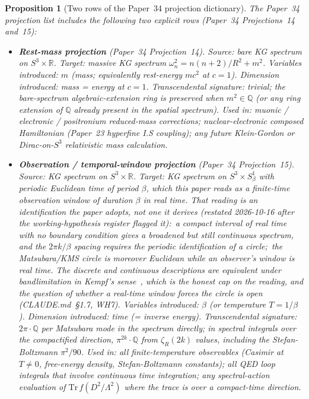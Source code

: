\documentclass[11pt]{article}
\newtheorem{proposition}{Proposition}
\begin{document}
\begin{proposition}[Two rows of the Paper~34 projection dictionary]
\label{prop:two_rows}
The Paper~34 projection list includes the following two explicit rows
(Paper~34 Projections~14 and~15):

\begin{itemize}
\setlength\itemsep{0pt}
\item \textbf{Rest-mass projection} (Paper~34 Projection~14).
\textit{Source:} bare KG spectrum on $S^3 \times \mathbb{R}$.
\textit{Target:} massive KG spectrum
$\omega_n^2 = n(n+2)/R^2 + m^2$.
\textit{Variables introduced:} $m$ (mass; equivalently rest-energy
$mc^2$ at $c=1$).
\textit{Dimension introduced:} mass = energy at $c = 1$.
\textit{Transcendental signature:} \emph{trivial}; the bare-spectrum
algebraic-extension ring is preserved when $m^2 \in \mathbb{Q}$ (or any
ring extension of $\mathbb{Q}$ already present in the spatial
spectrum).
\textit{Used in:} muonic / electronic / positronium reduced-mass
corrections; nuclear-electronic composed Hamiltonian (Paper~23
hyperfine I.S coupling); any future Klein-Gordon or Dirac-on-$S^3$
relativistic mass calculation.

\item \textbf{Observation / temporal-window projection} (Paper~34 Projection~15).
\textit{Source:} KG spectrum on $S^3 \times \mathbb{R}$.
\textit{Target:} KG spectrum on $S^3 \times S^1_\beta$ with periodic
Euclidean time of period $\beta$, which this paper \emph{reads} as a
finite-time observation window of duration $\beta$ in real time.  That
reading is an identification the paper adopts, not one it derives
(restated 2026-10-16 after the working-hypothesis register flagged it):\
a compact \emph{interval} of real time with no boundary condition gives
a broadened but still continuous spectrum, and the $2\pi k/\beta$
spacing requires the periodic identification of a \emph{circle};\ the
Matsubara/KMS circle is moreover Euclidean while an observer's window is
real time.  The discrete and continuous descriptions are equivalent
under bandlimitation in Kempf's sense~\cite{kempf2010}, which is the
honest cap on the reading, and the question of whether a real-time
window \emph{forces} the circle is open (CLAUDE.md~\S 1.7, WH7).
\textit{Variables introduced:} $\beta$ (or temperature $T = 1/\beta$).
\textit{Dimension introduced:} time (= inverse energy).
\textit{Transcendental signature:} $2\pi \cdot \mathbb{Q}$ per
Matsubara mode in the spectrum directly; in spectral integrals over
the compactified direction, $\pi^{2k} \cdot \mathbb{Q}$ from
$\zeta_R(2k)$ values, including the Stefan-Boltzmann $\pi^2/90$.
\textit{Used in:} all finite-temperature observables (Casimir at
$T \neq 0$, free-energy density, Stefan-Boltzmann constants); all
QED loop integrals that involve continuous time integration; any
spectral-action evaluation of $\mathrm{Tr}\, f(D^2/\Lambda^2)$
where the trace is over a compact-time direction.
\end{itemize}
\end{proposition}
\end{document}
